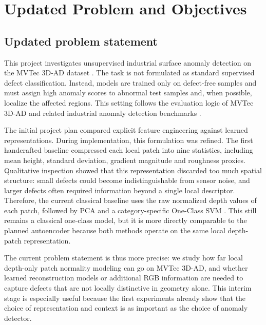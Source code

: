 \section{Updated Problem and Objectives}

\subsection*{Updated problem statement}
This project investigates unsupervised industrial surface anomaly detection on the MVTec 3D-AD dataset \cite{bergmann2022mvtec3d}. The task is not formulated as standard supervised defect classification. Instead, models are trained only on defect-free samples and must assign high anomaly scores to abnormal test samples and, when possible, localize the affected regions. This setting follows the evaluation logic of MVTec 3D-AD and related industrial anomaly detection benchmarks \cite{bergmann2019mvtec,bergmann2022mvtec3d}.

The initial project plan compared explicit feature engineering against learned representations. During implementation, this formulation was refined. The first handcrafted baseline compressed each local patch into nine statistics, including mean height, standard deviation, gradient magnitude and roughness proxies. Qualitative inspection showed that this representation discarded too much spatial structure: small defects could become indistinguishable from sensor noise, and larger defects often required information beyond a single local descriptor. Therefore, the current classical baseline uses the raw normalized depth values of each patch, followed by PCA and a category-specific One-Class SVM \cite{scholkopf2001estimating}. This still remains a classical one-class model, but it is more directly comparable to the planned autoencoder because both methods operate on the same local depth-patch representation.

The current problem statement is thus more precise: we study how far local depth-only patch normality modeling can go on MVTec 3D-AD, and whether learned reconstruction models or additional RGB information are needed to capture defects that are not locally distinctive in geometry alone. This interim stage is especially useful because the first experiments already show that the choice of representation and context is as important as the choice of anomaly detector.

